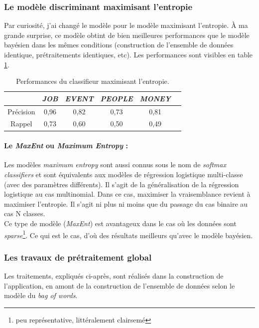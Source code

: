             \subsubsection{Le modèle discriminant maximisant l'entropie}
                Par curiosité, j'ai changé le modèle pour le modèle maximisant l'entropie. À ma grande surprise, ce modèle obtint de bien meilleures performances que le modèle bayésien dans les mêmes conditions (construction de l'ensemble de données identique, prétraitements identiques, etc). Les performances sont visibles en table \ref{tab:classif_perf3}.
                \begin{table}[h]
                    \centering
                    \begin{tabular}{| c | c | c | c | c | c |}
                        \hline
                         & \textit{JOB} & \textit{EVENT} & \textit{PEOPLE} & \textit{MONEY} \\
                        \hline
                        Précision & 0,96 & 0,82 & 0,73 & 0,81 \\
                        Rappel & 0,73 & 0,60 & 0,50 & 0,49 \\
                        \hline
                    \end{tabular}
                    \caption{Performances du classifieur maximisant l'entropie.}
                    \label{tab:classif_perf3}
                \end{table}

                \paragraph{Le \textit{MaxEnt} ou \textit{Maximum Entropy} :}
                    Les modèles \textit{maximum entropy} sont aussi connus sous le nom de \textit{softmax classifiers} et sont équivalents aux modèles de régression logistique multi-classe (avec des paramètres différents). Il s'agit de la généralisation de la régression logistique au cas multinomial. Dans ce cas, maximiser la vraisemblance revient à maximiser l'entropie. Il s'agit ni plus ni moins que du passage du cas binaire au cas N classes.\\
                    Ce type de modèle  (\textit{MaxEnt}) est avantageux dans le cas où les données sont \textit{sparse}\footnote{peu représentative, littéralement \og clairsemé \fg}. Ce qui est le cas, d'où des résultats meilleurs qu'avec le modèle bayésien.

            \subsubsection{Les travaux de prétraitement global}
            \label{ssubsec:travaux_globaux}
                Les traitements, expliqués ci-après, sont réalisés dans la construction de l'application, en amont de la construction de l'ensemble de données selon le modèle du \textit{bag of words}.


